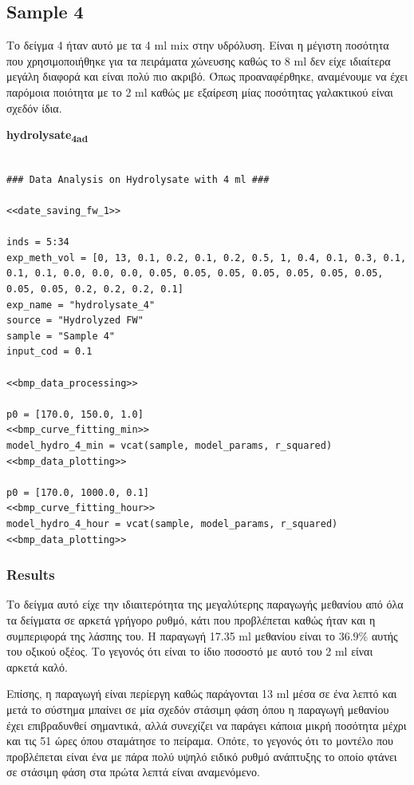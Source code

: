 \documentclass[11pt]{article}
\begin{document}
\subsection{Sample 4}
\label{sec:orgb4d477d}
Το δείγμα 4 ήταν αυτό με τα 4 ml mix στην υδρόλυση. Είναι η μέγιστη ποσότητα που χρησιμοποιήθηκε για τα πειράματα χώνευσης καθώς το 8 ml δεν είχε ιδιαίτερα μεγάλη διαφορά και είναι πολύ πιο ακριβό. Όπως προαναφέρθηκε, αναμένουμε να έχει παρόμοια ποιότητα με το 2 ml καθώς με εξαίρεση μίας ποσότητας γαλακτικού είναι σχεδόν ίδια.

\textbf{hydrolysate\textsubscript{4}\textsubscript{ad}}
\begin{verbatim}

### Data Analysis on Hydrolysate with 4 ml ###

<<date_saving_fw_1>>

inds = 5:34
exp_meth_vol = [0, 13, 0.1, 0.2, 0.1, 0.2, 0.5, 1, 0.4, 0.1, 0.3, 0.1, 0.1, 0.1, 0.0, 0.0, 0.0, 0.05, 0.05, 0.05, 0.05, 0.05, 0.05, 0.05, 0.05, 0.05, 0.2, 0.2, 0.2, 0.1]
exp_name = "hydrolysate_4"
source = "Hydrolyzed FW"
sample = "Sample 4"
input_cod = 0.1

<<bmp_data_processing>>

p0 = [170.0, 150.0, 1.0]
<<bmp_curve_fitting_min>>
model_hydro_4_min = vcat(sample, model_params, r_squared)
<<bmp_data_plotting>>

p0 = [170.0, 1000.0, 0.1]
<<bmp_curve_fitting_hour>>
model_hydro_4_hour = vcat(sample, model_params, r_squared)
<<bmp_data_plotting>>
\end{verbatim}

\subsubsection{Results}
\label{sec:orgf3350d1}
Το δείγμα αυτό είχε την ιδιαιτερότητα της μεγαλύτερης παραγωγής μεθανίου από όλα τα δείγματα σε αρκετά γρήγορο ρυθμό, κάτι που προβλέπεται καθώς ήταν και η συμπεριφορά της λάσπης του. Η παραγωγή 17.35 ml μεθανίου είναι το \(36.9 \%\) αυτής του οξικού οξέος. Το γεγονός ότι είναι το ίδιο ποσοστό με αυτό του 2 ml είναι αρκετά καλό.

Επίσης, η παραγωγή είναι περίεργη καθώς παράγονται 13 ml μέσα σε ένα λεπτό και μετά το σύστημα μπαίνει σε μία σχεδόν στάσιμη φάση όπου η παραγωγή μεθανίου έχει επιβραδυνθεί σημαντικά, αλλά συνεχίζει να παράγει κάποια μικρή ποσότητα μέχρι και τις 51 ώρες όπου σταμάτησε το πείραμα. Οπότε, το γεγονός ότι το μοντέλο που προβλέπεται είναι ένα με πάρα πολύ υψηλό ειδικό ρυθμό ανάπτυξης το οποίο φτάνει σε στάσιμη φάση στα πρώτα λεπτά είναι αναμενόμενο.
\end{document}
